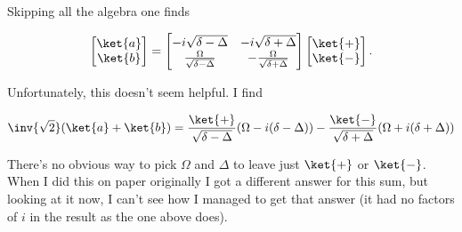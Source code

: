 Skipping all the algebra one finds

\begin{equation}\label{eqn:qmIexamPractice2008Dec:2:160}
\begin{bmatrix}
\ket{a} \\
\ket{b} \\
\end{bmatrix}
=
\begin{bmatrix}
-i\sqrt{\delta - \Delta} & -i\sqrt{\delta + \Delta} \\
\frac{\Omega}{\sqrt{\delta - \Delta}} &
-\frac{\Omega}{\sqrt{\delta + \Delta}} 
\end{bmatrix}
\begin{bmatrix}
\ket{+} \\
\ket{-} \\
\end{bmatrix}.
\end{equation}

Unfortunately, this doesn't seem helpful.  I find

\begin{equation}\label{eqn:qmIexamPractice2008Dec:2:170}
\inv{\sqrt{2}} ( \ket{a} + \ket{b} ) = 
\frac{\ket{+}}{\sqrt{\delta - \Delta}}( \Omega - i (\delta - \Delta) )
-\frac{\ket{-}}{\sqrt{\delta + \Delta}}( \Omega + i (\delta + \Delta) )
\end{equation}

There's no obvious way to pick $\Omega$ and $\Delta$ to leave just $\ket{+}$ or $\ket{-}$.  When I did this on paper originally I got a different answer for this sum, but looking at it now, I can't see how I managed to get that answer (it had no factors of $i$ in the result as the one above does).

\EndNoBibArticle
